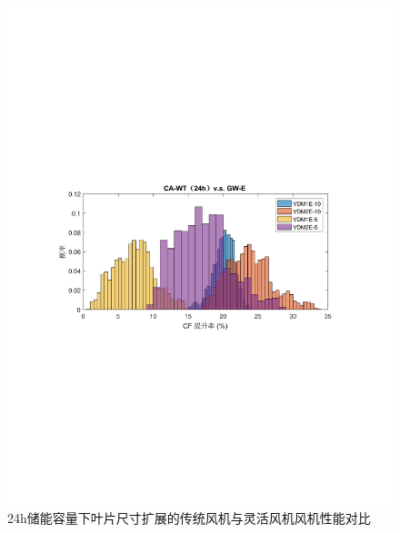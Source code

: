 \begin{figure}[H] %
  \centering
  \includegraphics[scale=0.75]{figures/Chap5-CA-WT-24h-VS-GW-E.pdf}
  \caption{24h储能容量下叶片尺寸扩展的传统风机与灵活风机风机性能对比}
  \label{fig:CA-WT-24h-VS-GW-E}
\end{figure}

